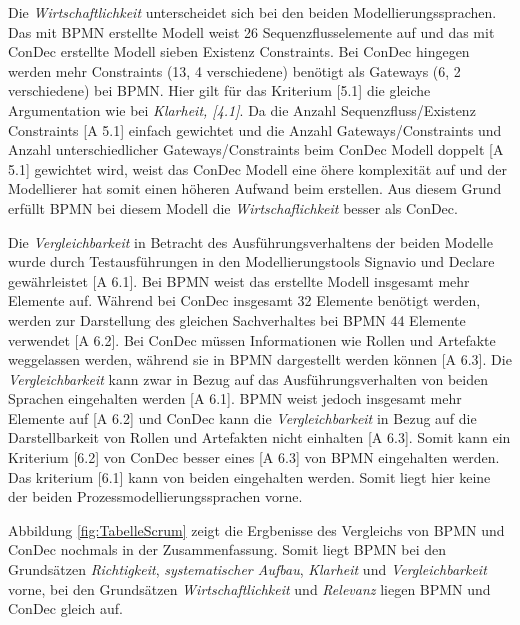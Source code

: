 Die \textit{Wirtschaftlichkeit} unterscheidet sich bei den beiden Modellierungssprachen. Das mit BPMN erstellte Modell weist 26 Sequenzflusselemente auf und das mit ConDec erstellte Modell sieben Existenz Constraints. Bei ConDec hingegen werden mehr Constraints (13, 4 verschiedene) benötigt als Gateways (6, 2 verschiedene) bei BPMN. Hier gilt für das Kriterium [5.1] die gleiche Argumentation wie bei \textit{Klarheit, [4.1]}. Da die Anzahl Sequenzfluss/Existenz Constraints [A 5.1] einfach gewichtet und die Anzahl Gateways/Constraints und Anzahl unterschiedlicher Gateways/Constraints beim ConDec Modell doppelt [A 5.1] gewichtet wird, weist das ConDec Modell eine öhere komplexität auf und der Modellierer hat somit einen höheren Aufwand beim erstellen.\newline
Aus diesem Grund erfüllt BPMN bei diesem Modell die \textit{Wirtschaflichkeit} besser als ConDec.\newline

Die \textit{Vergleichbarkeit} in Betracht des Ausführungsverhaltens der beiden Modelle wurde durch Testausführungen in den Modellierungstools Signavio und Declare gewährleistet [A 6.1].\newline
Bei BPMN weist das erstellte Modell insgesamt mehr Elemente auf. Während bei ConDec insgesamt 32 Elemente benötigt werden, werden zur Darstellung des gleichen Sachverhaltes bei BPMN 44 Elemente verwendet [A 6.2]. \newline
Bei ConDec müssen Informationen wie Rollen und Artefakte weggelassen werden, während sie in BPMN dargestellt werden können [A 6.3].\newline
Die \textit{Vergleichbarkeit} kann zwar in Bezug auf das Ausführungsverhalten von beiden Sprachen eingehalten werden [A 6.1]. BPMN weist jedoch insgesamt mehr Elemente auf [A 6.2] und ConDec kann die \textit{Vergleichbarkeit} in Bezug auf die Darstellbarkeit von Rollen und Artefakten nicht einhalten [A 6.3]. Somit kann ein Kriterium [6.2] von ConDec besser eines [A 6.3] von BPMN eingehalten werden. Das kriterium [6.1] kann von beiden eingehalten werden. Somit liegt hier keine der beiden Prozessmodellierungssprachen vorne.\newline

Abbildung \ref{fig:TabelleScrum} zeigt die Ergbenisse des Vergleichs von BPMN und ConDec nochmals in der Zusammenfassung. Somit liegt BPMN bei den Grundsätzen \textit{Richtigkeit}, \textit{systematischer Aufbau}, \textit{Klarheit} und \textit{Vergleichbarkeit} vorne, bei den Grundsätzen \textit{Wirtschaftlichkeit} und \textit{Relevanz} liegen BPMN und ConDec gleich auf. \newline

